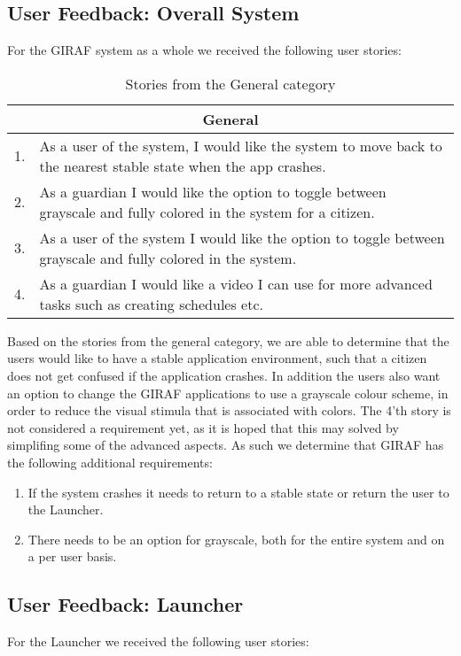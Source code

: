 \subsection{User Feedback: Overall System}
For the GIRAF system as a whole we received the following user stories:
\begin{table}[H]
\begin{tabular}{|c|p{12.5cm}|}
\hline 
\multicolumn{2}{|c|}{General}\\\hline
1. & As a user of the system, I would like the system to move back to the
nearest stable state when the app crashes.\\\hline
2. & As a guardian I would like the option to toggle between grayscale and fully
colored in the system for a citizen. \\ \hline
3. & As a user of the system I would like the option to toggle between grayscale
and fully colored in the system. \\\hline
4. & As a guardian I would like a video I can use for more advanced tasks such
as creating schedules etc.\\\hline
\end{tabular}
\caption{Stories from the General category}
\label{UserStoriesGeneral}
\end{table}

Based on the stories from the general category, we are able to determine that
the users would like to have a stable application environment, such that a
citizen does not get confused if the application crashes. In addition the users
also want an option to change the GIRAF applications to use a grayscale colour
scheme, in order to reduce the visual stimula that is associated with colors.
The 4'th story is not considered a requirement yet, as it is hoped that this may
solved by simplifing some of the advanced aspects. As such we determine that
GIRAF has the following additional requirements:
\begin{enumerate}
  \item If the system crashes it needs to return to a stable state or return the
  user to the Launcher.
  \item There needs to be an option for grayscale, both for the entire system
  and on a per user basis.
\end{enumerate}

\subsection{User Feedback: Launcher}
For the Launcher we received the following user stories:

